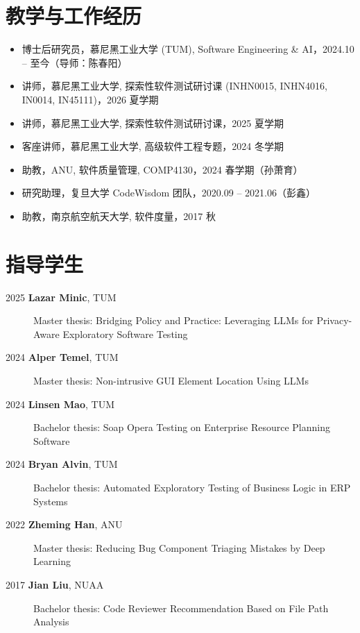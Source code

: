 \documentclass[11pt,a4paper]{ctexart}
\begin{document}
\section*{教学与工作经历}
\begin{itemize}
  \item 博士后研究员，慕尼黑工业大学 (TUM), Software Engineering \& AI，2024.10 -- 至今（导师：陈春阳）
  \item 讲师，慕尼黑工业大学, 探索性软件测试研讨课 (INHN0015, INHN4016, IN0014, IN45111)，2026 夏学期
  \item 讲师，慕尼黑工业大学, 探索性软件测试研讨课，2025 夏学期
  \item 客座讲师，慕尼黑工业大学, 高级软件工程专题，2024 冬学期
  \item 助教，ANU, 软件质量管理, COMP4130，2024 春学期（孙萧育）
  \item 研究助理，复旦大学 CodeWisdom 团队，2020.09 -- 2021.06（彭鑫）
  \item 助教，南京航空航天大学, 软件度量，2017 秋
\end{itemize}

\section*{指导学生}
    \begin{description}
      \item[2025 \textbf{Lazar Minic}, TUM] Master thesis: Bridging Policy and Practice: Leveraging LLMs for Privacy-Aware Exploratory Software Testing
      \item[2024 \textbf{Alper Temel}, TUM] Master thesis: Non-intrusive GUI Element Location Using LLMs
      \item[2024 \textbf{Linsen Mao}, TUM] Bachelor thesis: Soap Opera Testing on Enterprise Resource Planning Software
      \item[2024 \textbf{Bryan Alvin}, TUM] Bachelor thesis: Automated Exploratory Testing of Business Logic in ERP Systems
      \item[2022 \textbf{Zheming Han}, ANU] Master thesis: Reducing Bug Component Triaging Mistakes by Deep Learning
      \item[2017 \textbf{Jian Liu}, NUAA] Bachelor thesis: Code Reviewer Recommendation Based on File Path Analysis
    \end{description}
\end{document}

